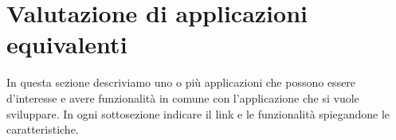 \documentclass[11pt]{article}
\begin{document}
\section{Valutazione di applicazioni equivalenti}
In questa sezione descriviamo uno o pi\`u applicazioni che possono
essere d'interesse e avere funzionalit\`a in comune con l'applicazione
che si vuole sviluppare. In ogni sottosezione indicare il link e le
funzionalit\`a spiegandone le caratteristiche.
\end{document}
